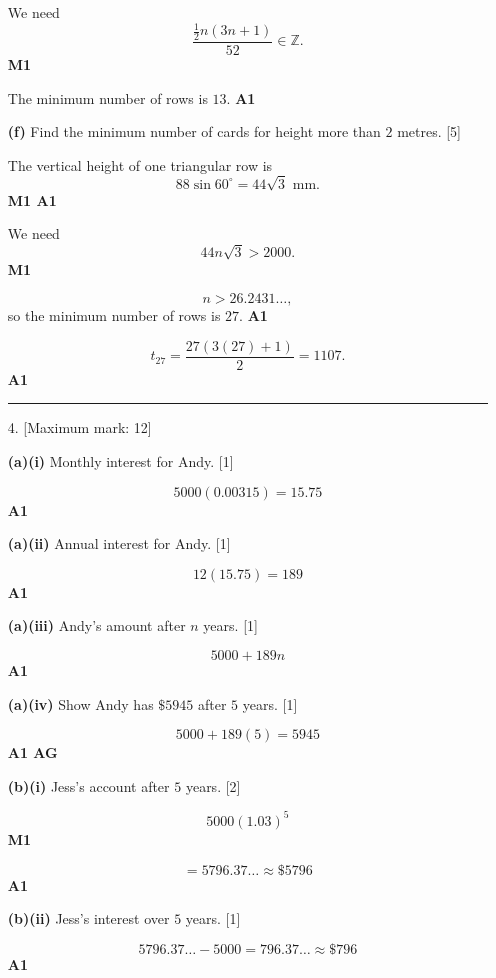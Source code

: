 \documentclass[12pt, twoside]{article}
\begin{document}
\begin{enumerate}[itemsep=0.35cm]
We need
\[
\frac{\frac{1}{2}n(3n+1)}{52}\in\mathbb{Z}.
\]
\hfill \textbf{M1}

The minimum number of rows is $13$. \hfill \textbf{A1}

\medskip

\textbf{(f)} Find the minimum number of cards for height more than
$2$ metres. \hfill [5]

The vertical height of one triangular row is
\[
88\sin 60^\circ=44\sqrt{3}\text{ mm}.
\]
\hfill \textbf{M1 A1}

We need
\[
44n\sqrt{3}>2000.
\]
\hfill \textbf{M1}

\[
n>26.2431\ldots,
\]
so the minimum number of rows is $27$. \hfill \textbf{A1}

\[
t_{27}=\frac{27(3(27)+1)}{2}=1107.
\]
\hfill \textbf{A1}

\bigskip
\hrule
\bigskip

\item[4.] [Maximum mark: 12]

\textbf{(a)(i)} Monthly interest for Andy. \hfill [1]

\[
5000(0.00315)=15.75
\]
\hfill \textbf{A1}

\medskip

\textbf{(a)(ii)} Annual interest for Andy. \hfill [1]

\[
12(15.75)=189
\]
\hfill \textbf{A1}

\medskip

\textbf{(a)(iii)} Andy's amount after $n$ years. \hfill [1]

\[
5000+189n
\]
\hfill \textbf{A1}

\medskip

\textbf{(a)(iv)} Show Andy has $\$5945$ after $5$ years. \hfill [1]

\[
5000+189(5)=5945
\]
\hfill \textbf{A1 AG}

\medskip

\textbf{(b)(i)} Jess's account after $5$ years. \hfill [2]

\[
5000(1.03)^5
\]
\hfill \textbf{M1}

\[
=5796.37\ldots \approx \$5796
\]
\hfill \textbf{A1}

\medskip

\textbf{(b)(ii)} Jess's interest over $5$ years. \hfill [1]

\[
5796.37\ldots-5000=796.37\ldots \approx \$796
\]
\hfill \textbf{A1}


\end{enumerate}
\end{document}
